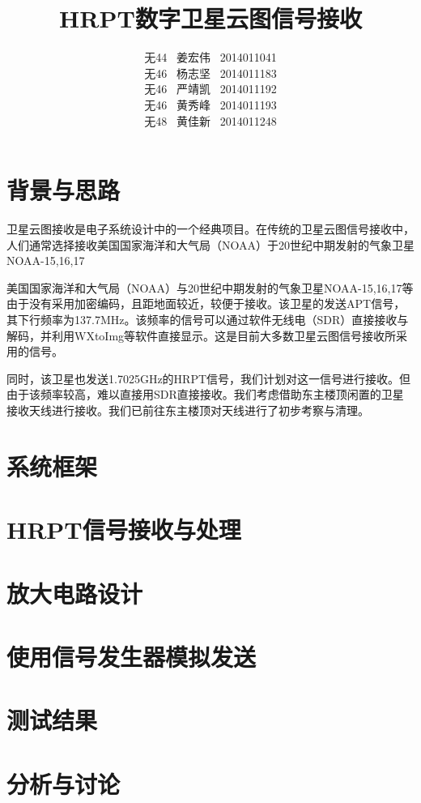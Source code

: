 \documentclass[UTF8]{ctexart}
\begin{document}
\title{\textbf{HRPT数字卫星云图信号接收}}
\author{无44 \ 姜宏伟 \ 2014011041\\
        无46 \ 杨志坚 \ 2014011183\\
        无46 \ 严靖凯 \ 2014011192\\
        无46 \ 黄秀峰 \ 2014011193\\
        无48 \ 黄佳新 \ 2014011248}
\date{}
\maketitle

\section{背景与思路}

卫星云图接收是电子系统设计中的一个经典项目。在传统的卫星云图信号接收中，人们通常选择接收美国国家海洋和大气局（NOAA）于20世纪中期发射的气象卫星NOAA-15,16,17

美国国家海洋和大气局（NOAA）与20世纪中期发射的气象卫星NOAA-15,16,17等由于没有采用加密编码，且距地面较近，较便于接收。该卫星的发送APT信号，其下行频率为137.7MHz。该频率的信号可以通过软件无线电（SDR）直接接收与解码，并利用WXtoImg等软件直接显示。这是目前大多数卫星云图信号接收所采用的信号。

同时，该卫星也发送1.7025GHz的HRPT信号，我们计划对这一信号进行接收。但由于该频率较高，难以直接用SDR直接接收。我们考虑借助东主楼顶闲置的卫星接收天线进行接收。我们已前往东主楼顶对天线进行了初步考察与清理。


\section{系统框架}

\section{HRPT信号接收与处理}

\section{放大电路设计}

\section{使用信号发生器模拟发送}

\section{测试结果}

\section{分析与讨论}
\end{document}
